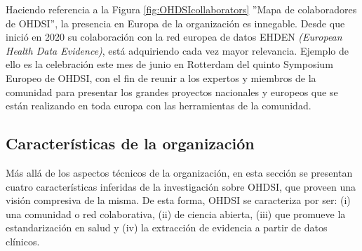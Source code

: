 Haciendo referencia a la Figura \ref{fig:OHDSIcollaborators} ''Mapa de colaboradores de OHDSI'', la presencia en Europa de la organización es innegable. Desde que inició en 2020 su colaboración con la red europea de datos EHDEN \textit{(European Health Data Evidence)}, está adquiriendo cada vez mayor relevancia. Ejemplo de ello es la celebración este mes de junio en Rotterdam del quinto Symposium Europeo de OHDSI, con el fin de reunir a los expertos y miembros de la comunidad para presentar los grandes proyectos nacionales y europeos que se están realizando en toda europa con las herramientas de la comunidad.



\subsection{Características de la organización} \label{subsec:05caracteristicas}

Más allá de los aspectos técnicos de la organización, en esta sección se presentan cuatro características inferidas de la investigación sobre OHDSI, que proveen una visión compresiva de la misma. De esta forma, OHDSI se caracteriza por ser: (i) una comunidad o red colaborativa, (ii) de ciencia abierta, (iii) que promueve la estandarización en salud y (iv) la extracción de evidencia a partir de datos clínicos.


